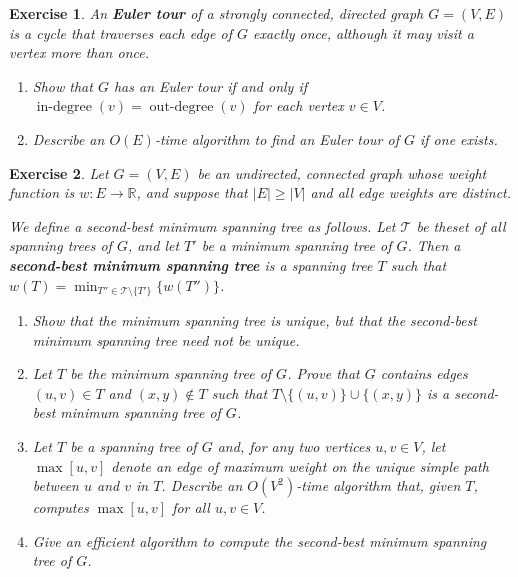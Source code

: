 \documentclass[11pt]{amsart}
\theoremstyle{theorem}
\newtheorem{exercise}{Exercise}
\newcommand\R{\mathbb{R}}
\begin{document}
\begin{exercise}
An \textbf{Euler tour} of a strongly connected, directed graph $G=(V,E)$ is a cycle that traverses each edge of $G$ exactly once, although it may visit a vertex more than once.
\begin{enumerate}
\item Show that $G$ has an Euler tour if and only if $\operatorname{in-degree}(v)=\operatorname{out-degree}(v)$ for each vertex $v\in V$.
\item Describe an $O(E)$-time algorithm to find an Euler tour of $G$ if one exists.
\end{enumerate}
\end{exercise}


\begin{exercise}
Let $G=(V,E)$ be an undirected, connected graph whose weight function is $w:E\to\R$, and suppose that $|E|\geq |V|$ and all edge weights are distinct.

We define a second-best minimum spanning tree as follows. Let $\mathcal{T}$ be theset of all spanning trees of $G$, and let $T'$ be a minimum spanning tree of $G$. Then a \textbf{second-best minimum spanning tree} is a spanning tree $T$ such that $w(T) = \min_{T''\in \mathcal{T}\setminus\{T'\}}\{w(T'')\}$.
\begin{enumerate}
\item Show that the minimum spanning tree is unique, but that the second-best minimum spanning tree need not be unique.
\item Let $T$ be the minimum spanning tree of $G$. Prove that $G$ contains edges $(u,v)\in T$ and $(x,y)\not\in T$ such that $T\setminus\{(u,v)\}\cup\{(x,y)\}$ is a second-best minimum spanning tree of $G$.
\item Let $T$ be a spanning tree of $G$ and, for any two vertices $u,v\in V$, let $\max[u,v]$ denote an edge of maximum weight on the unique simple path between $u$ and $v$ in $T$. Describe an $O(V^2)$-time algorithm that, given $T$, computes $\max[u,v]$ for all $u,v\in V$.
\item Give an efficient algorithm to compute the second-best minimum spanning tree of $G$.
\end{enumerate}
\end{exercise}
\end{document}
